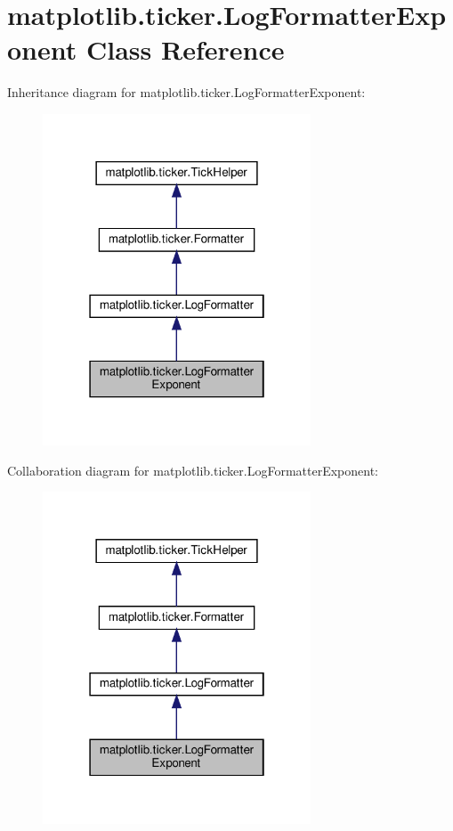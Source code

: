 \hypertarget{classmatplotlib_1_1ticker_1_1LogFormatterExponent}{}\section{matplotlib.\+ticker.\+Log\+Formatter\+Exponent Class Reference}
\label{classmatplotlib_1_1ticker_1_1LogFormatterExponent}


Inheritance diagram for matplotlib.\+ticker.\+Log\+Formatter\+Exponent\+:
\nopagebreak
\begin{figure}[H]
\begin{center}
\leavevmode
\includegraphics[width=226pt]{classmatplotlib_1_1ticker_1_1LogFormatterExponent__inherit__graph}
\end{center}
\end{figure}


Collaboration diagram for matplotlib.\+ticker.\+Log\+Formatter\+Exponent\+:
\nopagebreak
\begin{figure}[H]
\begin{center}
\leavevmode
\includegraphics[width=226pt]{classmatplotlib_1_1ticker_1_1LogFormatterExponent__coll__graph}
\end{center}
\end{figure}
